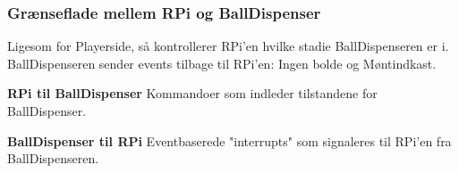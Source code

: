 \documentclass[Arkitektur/System_main.tex]{subfiles}
\begin{document}
\subsubsection{Grænseflade mellem RPi og BallDispenser}
Ligesom for Playerside, så kontrollerer RPi'en hvilke stadie BallDispenseren er i. BallDispenseren sender events tilbage til RPi'en: Ingen bolde og Møntindkast. 

\textbf{RPi til BallDispenser}
Kommandoer som indleder tilstandene for BallDispenser. 

\begin{table}[H]
\end{table}

\textbf{BallDispenser til RPi}
Eventbaserede "interrupts" som signaleres til RPi'en fra BallDispenseren. 
\begin{table}[H]
\end{table}
\end{document}
